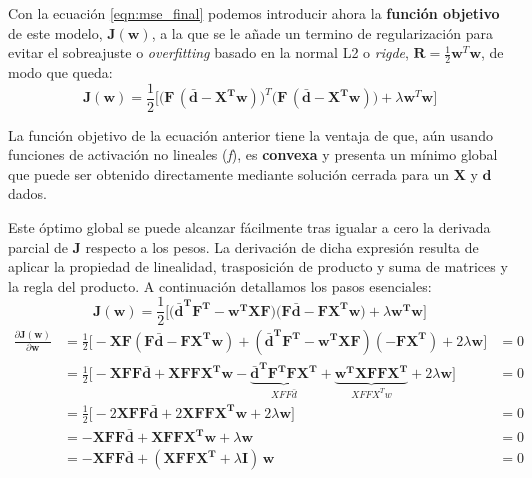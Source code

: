 \documentclass[00-Trabajo_Final.tex]{subfiles}
\begin{document}
Con la ecuación \eqref{eqn:mse_final} podemos introducir ahora la \textbf{función objetivo} de este modelo, $\boldsymbol{J}(\boldsymbol{w})$, a la que se le añade un termino de regularización para evitar el sobreajuste o \textit{overfitting} basado en la normal L2 o \textit{rigde}, $\boldsymbol{R} = \frac{1}{2}\boldsymbol{w}^T\boldsymbol{w}$, de modo que queda:
\begin{equation}
    \boldsymbol{J}(\boldsymbol{w}) = \frac{1}{2} \biggl[\bigl( \boldsymbol{F} \, (\bar{\boldsymbol{d}} - \boldsymbol{X^T w})\bigr)^T  \bigl(\boldsymbol{F} \, (\bar{\boldsymbol{d}} - \boldsymbol{X^T w})\bigr) + \lambda\boldsymbol{w}^T\boldsymbol{w}\biggr]
\end{equation}

La función objetivo de la ecuación anterior tiene la ventaja de que, aún usando funciones de activación no lineales (\textit{f}), es \textbf{convexa} y presenta un mínimo global que puede ser obtenido directamente mediante solución cerrada para un $\boldsymbol{X}$ y $\boldsymbol{d}$ dados.

Este óptimo global se puede alcanzar fácilmente tras igualar a cero la derivada parcial de $\boldsymbol{J}$ respecto a los pesos. La derivación de dicha expresión resulta de aplicar la propiedad de linealidad, trasposición de producto y suma de matrices y la regla del producto. A continuación detallamos los pasos esenciales:
\[
    \boldsymbol{J}(\boldsymbol{w}) = \frac{1}{2} \biggl[
    \bigl(\boldsymbol{\bar{d}^T F^T} - \boldsymbol{w^TXF} \bigr) \bigl(\boldsymbol{F\bar{d}} -\boldsymbol{FX^Tw} \bigr) + \lambda \boldsymbol{w^Tw}
    \biggr]
\]
\begin{align*}
    \frac{\partial\boldsymbol{J(w)}}{\partial\boldsymbol{w}} &= \frac{1}{2} \biggl[ -\boldsymbol{XF}(\boldsymbol{F}\boldsymbol{\bar{d}} - \boldsymbol{FX^Tw}) + (\boldsymbol{\bar{d}^T F^T} - \boldsymbol{w^T XF})(-\boldsymbol{FX^T})+ 2\lambda\boldsymbol{w}\biggl] &= 0 \\
    &= \frac{1}{2} \biggl[ -\boldsymbol{XFF\bar{d}} + \boldsymbol{XFFX^Tw} -
       \underbrace{\boldsymbol{\bar{d}^T F^T FX^T}}_{XFF\bar{d}} + \underbrace{\boldsymbol{w^T XFFX^T}}_{XFFX^Tw} + 2\lambda\boldsymbol{w}\biggl] &= 0 \\
    &= \frac{1}{2} \biggl[ -2\boldsymbol{XFF\bar{d}} + 2\boldsymbol{XFFX^Tw} + 2\lambda\boldsymbol{w}\biggl] &= 0 \\
    &= -\boldsymbol{XFF\bar{d}} + \boldsymbol{XFFX^Tw} + \lambda\boldsymbol{w} &= 0 \\
    &= -\boldsymbol{XFF\bar{d}} + (\boldsymbol{XFFX^T} + \lambda\boldsymbol{I})\,\boldsymbol{w} &=0
\end{align*}
\end{document}
